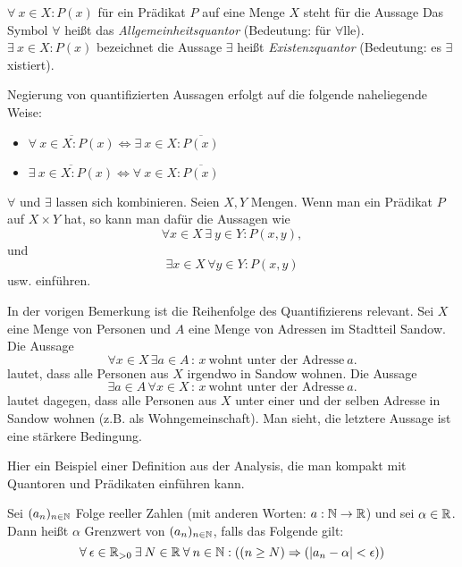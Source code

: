 \begin{defn}
$ \forall\: x \in X : P(x) $ für ein Prädikat $ P $ auf eine Menge $ X $ steht für die Aussage  Das Symbol $ \forall $ heißt das \emph{Allgemeinheitsquantor} (Bedeutung: für $ \forall $lle). \\[10pt]
%
$ \exists\: x \in X : P(x) $ bezeichnet die Aussage  $ \exists $ heißt \emph{Existenzquantor} (Bedeutung: es $ \exists $xistiert).
\end{defn}

\begin{bem}
	Negierung von quantifizierten Aussagen erfolgt auf die folgende naheliegende Weise: 
	\begin{itemize}
		\item $ \overline{\forall\: x \in X : P(x)} \Leftrightarrow \exists\: x \in X : \overline{P(x)} $
		\item $ \overline{\exists\: x \in X : P(x)} \Leftrightarrow \forall\: x \in X : \overline{P(x)} $
	\end{itemize}
\end{bem}


\begin{bem}
	$ \forall $ und $ \exists $ lassen sich kombinieren. Seien $X, Y$ Mengen. Wenn man ein Prädikat $ P $ auf $ X \times Y $ hat, so kann man dafür die Aussagen wie 
	\[
		 \forall x \in X \,\exists\: y \in Y : P(x,y), 
	\]
	und
	\[\exists x \in X  \, \forall y \in Y : P(x,y) 
	\]
	usw. einführen. 
\end{bem}


\begin{bem}
	In der vorigen Bemerkung ist die Reihenfolge des Quantifizierens relevant. Sei $X$ eine Menge von  Personen und $A$ eine Menge von Adressen im Stadtteil Sandow. Die Aussage 
	\[
		\forall x \in X \, \exists a \in A \, :\, x \ \text{wohnt unter der Adresse} \  a .
	\]
	lautet, dass alle Personen aus $X$ irgendwo in Sandow wohnen. Die Aussage 
	\[
		\exists a \in A \, \forall x \in X \,:\, x \ \text{wohnt unter der Adresse} \ a.
	\]
	lautet dagegen, dass alle Personen aus $X$ unter einer und der selben Adresse in Sandow wohnen (z.B. als Wohngemeinschaft). Man sieht, die letztere Aussage ist eine stärkere Bedingung. 
\end{bem} 

\begin{bsp}
	Hier ein Beispiel einer Definition aus der Analysis, die man kompakt mit Quantoren und Prädikaten einführen kann. 
	
	Sei $ (a_n)_{n \in \mathbb{N}} $ Folge reeller Zahlen (mit anderen Worten: $ a : \mathbb{N} \to \mathbb{R} $) und sei $ \alpha \in \mathbb{R} $. Dann heißt $ \alpha $ Grenzwert von $ (a_n)_{n \in \mathbb{N}} $, falls das Folgende gilt:
	\begin{equation*}
		\forall\: \epsilon \in \mathbb{R}_{>0} \:\exists\: N \in \mathbb{R} \:\forall\: n \in \mathbb{N}: \left( (n \geq N) \Rightarrow (|a_n - \alpha| < \epsilon) \right)
	\end{equation*}
\end{bsp} 

